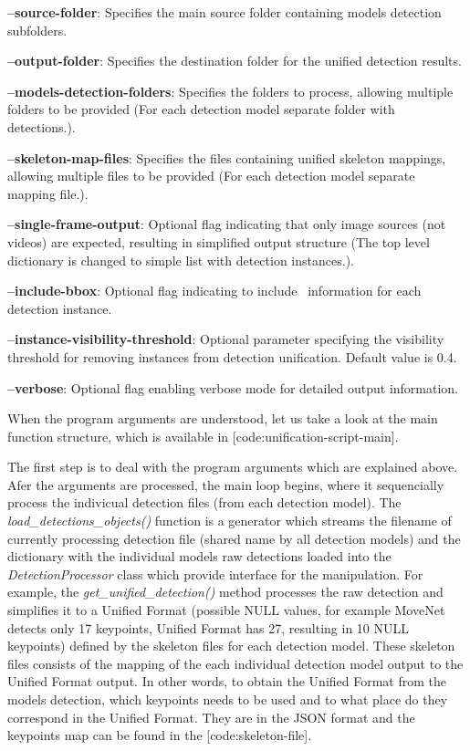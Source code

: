 \startitemize
    \item {\bf --source-folder}: Specifies the main source folder containing models detection subfolders.
    \item {\bf --output-folder}: Specifies the destination folder for the unified detection results.
    \item {\bf --models-detection-folders}: Specifies the folders to process, allowing multiple folders to be provided (For each detection model separate folder with detections.).
    \item {\bf --skeleton-map-files}: Specifies the files containing unified skeleton mappings, allowing multiple files to be provided (For each detection model separate mapping file.).
    \item {\bf --single-frame-output}: Optional flag indicating that only image sources (not videos) are expected, resulting in simplified output structure (The top level dictionary is changed to simple list with detection instances.).
    \item {\bf --include-bbox}: Optional flag indicating to include \BBOX\ information for each detection instance.
    \item {\bf --instance-visibility-threshold}: Optional parameter specifying the visibility threshold for removing instances from detection unification. Default value is 0.4.
    \item {\bf --verbose}: Optional flag enabling verbose mode for detailed output information.
\stopitemize

When the program arguments are understood, let us take a look at the main function structure, which is available in [code:unification-script-main].


The first step is to deal with the program arguments which are explained above. Afer the arguments are processed, the main loop begins, where it sequencially process the indivicual detection files (from each detection model). The {\it load_detections_objects()} function is a generator which streams the filename of currently processing detection file (shared name by all detection models) and the dictionary with the individual models raw detections loaded into the {\it DetectionProcessor} class which provide interface for the manipulation. For example, the {\it get_unified_detection()} method processes the raw detection and simplifies it to a Unified Format (possible NULL values, for example MoveNet detects only 17 keypoints, Unified Format has 27, resulting in 10 NULL keypoints) defined by the skeleton files for each detection model. These skeleton files consists of the mapping of the each individual detection model output to the Unified Format output. In other words, to obtain the Unified Format from the models detection, which keypoints needs to be used and to what place do they correspond in the Unified Format. They are in the JSON format and the keypoints map can be found in the [code:skeleton-file].

